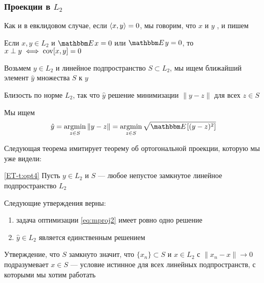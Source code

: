 \begin{frame}\frametitle{Проекции в $L_2$}

    \vspace{2em}
    Как и в евклидовом случае, если $\left\langle{x,y}\right\rangle=0$, мы говорим, что $x$ и $y$
    , и пишем 
    
    \vspace{1em}
    \Fact
    Если $x, y \in L_2$ и $\EE x=0$ или $\EE y=0$, то $x \perp y
    \iff  \operatorname{cov}[x,y] = 0$
    
\end{frame}

\begin{frame}
    
    \vspace{2em}
    Возьмем $y \in L_2$ и
    линейное подпространство $S \subset L_2$, мы ищем ближайший элемент $\hat y$ множества $S$
    к $y$
    
    Близость по норме $L_2$, так что $\hat y$ решение минимизации
    $\| y - z \|$ для всех $z \in S$
    
    Мы ищем
    \begin{equation}
        \label{eq:mproj2}
        \hat y 
        = \argmin_{z \in S} \|y - z\|
        = \argmin_{z \in S} \sqrt{\EE [ (y - z)^2 ]}
    \end{equation}

\end{frame}

\begin{frame}

    \vspace{2em}
    Следующая теорема имитирует теорему об ортогональной проекции, которую мы уже видели:
    
    \vspace{.7em}
    \Thm\eqref{ET-t:opt4}
    Пусть $y \in L_2$ и $S$ --- любое непустое замкнутое
    линейное подпространство $L_2$
    
    Следующие утверждения верны:
    \begin{enumerate}
        \item задача оптимизации \eqref{eq:mproj2} имеет ровно одно решение
        \item $\hat y \in L_2$ является единственным решением
    \end{enumerate}
    Утверждение, что $S$ замкнуто значит, что $\{x_n \} \subset S$ и $x
    \in L_2$ с $\| x_n - x \| \to 0$ подразумевает $x \in S$ ---  условие истинное
    для всех линейных подпространств, с которыми мы хотим работать
    
\end{frame}

